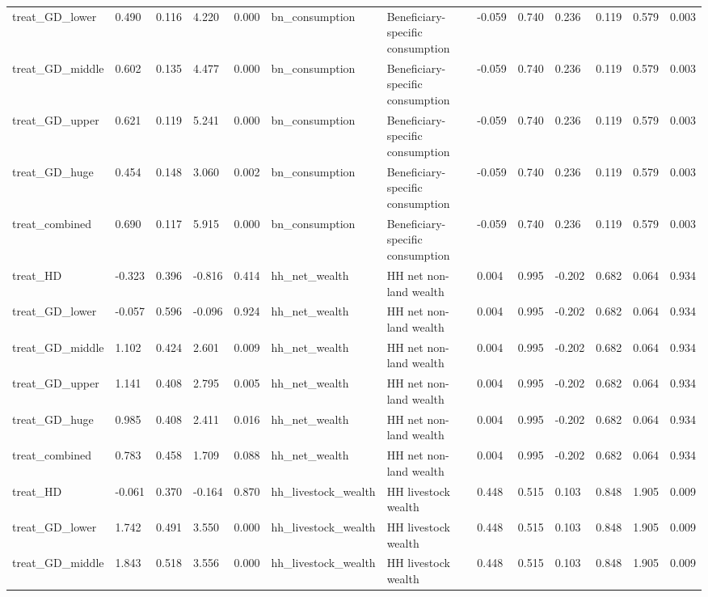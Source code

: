 \begin{tabular}{lllllllllllll}
treat\_GD\_lower & 0.490 & 0.116 & 4.220 & 0.000 & bn\_consumption & Beneficiary-specific consumption & -0.059 & 0.740 & 0.236 & 0.119 & 0.579 & 0.003 \\
treat\_GD\_middle & 0.602 & 0.135 & 4.477 & 0.000 & bn\_consumption & Beneficiary-specific consumption & -0.059 & 0.740 & 0.236 & 0.119 & 0.579 & 0.003 \\
treat\_GD\_upper & 0.621 & 0.119 & 5.241 & 0.000 & bn\_consumption & Beneficiary-specific consumption & -0.059 & 0.740 & 0.236 & 0.119 & 0.579 & 0.003 \\
treat\_GD\_huge & 0.454 & 0.148 & 3.060 & 0.002 & bn\_consumption & Beneficiary-specific consumption & -0.059 & 0.740 & 0.236 & 0.119 & 0.579 & 0.003 \\
treat\_combined & 0.690 & 0.117 & 5.915 & 0.000 & bn\_consumption & Beneficiary-specific consumption & -0.059 & 0.740 & 0.236 & 0.119 & 0.579 & 0.003 \\
treat\_HD & -0.323 & 0.396 & -0.816 & 0.414 & hh\_net\_wealth & HH net non-land wealth & 0.004 & 0.995 & -0.202 & 0.682 & 0.064 & 0.934 \\
treat\_GD\_lower & -0.057 & 0.596 & -0.096 & 0.924 & hh\_net\_wealth & HH net non-land wealth & 0.004 & 0.995 & -0.202 & 0.682 & 0.064 & 0.934 \\
treat\_GD\_middle & 1.102 & 0.424 & 2.601 & 0.009 & hh\_net\_wealth & HH net non-land wealth & 0.004 & 0.995 & -0.202 & 0.682 & 0.064 & 0.934 \\
treat\_GD\_upper & 1.141 & 0.408 & 2.795 & 0.005 & hh\_net\_wealth & HH net non-land wealth & 0.004 & 0.995 & -0.202 & 0.682 & 0.064 & 0.934 \\
treat\_GD\_huge & 0.985 & 0.408 & 2.411 & 0.016 & hh\_net\_wealth & HH net non-land wealth & 0.004 & 0.995 & -0.202 & 0.682 & 0.064 & 0.934 \\
treat\_combined & 0.783 & 0.458 & 1.709 & 0.088 & hh\_net\_wealth & HH net non-land wealth & 0.004 & 0.995 & -0.202 & 0.682 & 0.064 & 0.934 \\
treat\_HD & -0.061 & 0.370 & -0.164 & 0.870 & hh\_livestock\_wealth & HH livestock wealth & 0.448 & 0.515 & 0.103 & 0.848 & 1.905 & 0.009 \\
treat\_GD\_lower & 1.742 & 0.491 & 3.550 & 0.000 & hh\_livestock\_wealth & HH livestock wealth & 0.448 & 0.515 & 0.103 & 0.848 & 1.905 & 0.009 \\
treat\_GD\_middle & 1.843 & 0.518 & 3.556 & 0.000 & hh\_livestock\_wealth & HH livestock wealth & 0.448 & 0.515 & 0.103 & 0.848 & 1.905 & 0.009 \\

\end{tabular}
